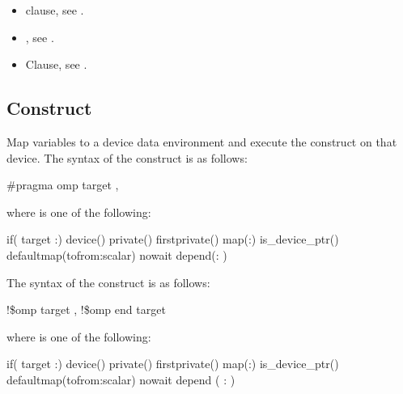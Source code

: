 \crossreferences
\begin{itemize}
\item {} clause, see 
.

\item {}, see 
. 

\item {} Clause, see .
\end{itemize}










\subsection{ Construct}
\label{subsec:target Construct}
\summary
Map variables to a device data environment and execute the construct on that device.
\syntax
\ccppspecificstart
The syntax of the  construct is as follows:

\begin{boxedcode}
\#pragma omp target \plc{[clause[ [},\plc{] clause] ... ] new-line}
\end{boxedcode}

where  is one of the following:

\begin{indentedcodelist}
if(\plc{[} target :\plc{] scalar-expression})
device()
private()
firstprivate()
map(\plc{[[map-type-modifier[,]] map-type}:\plc{ ] list})
is\_device\_ptr()
defaultmap(tofrom:scalar)
nowait
depend(: )
\end{indentedcodelist}
\ccppspecificend

\begin{samepage}
\smallskip
\fortranspecificstart
The syntax of the  construct is as follows:

\begin{boxedcode}
!\$omp target \plc{[clause[ [},\plc{] clause] ... ]}
!\$omp end target
\end{boxedcode}
\end{samepage}

\begin{samepage}
where  is one of the following:

\begin{indentedcodelist}
if(\plc{[} target :\plc{] scalar-logical-expression})
device()
private()
firstprivate()
map(\plc{[[map-type-modifier[,]] map-type}:\plc{ ] list})
is\_device\_ptr()
defaultmap(tofrom:scalar)
nowait
depend ( : )
\end{indentedcodelist}
\end{samepage}

